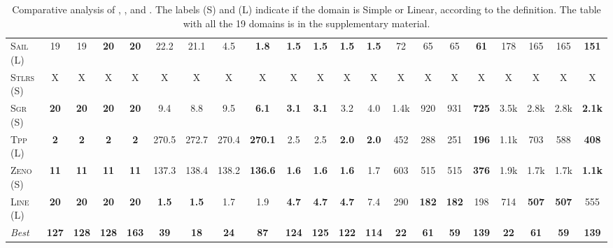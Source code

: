 \documentclass[11pt,landscape]{article}
\begin{document}
\begin{table*}[tb]
{\begin{tabular}{|l||cccc||cccc||cccc||cccc||cccc||}
\textsc{Sail} (L)&19&19&\textbf{20}&\textbf{20}&22.2&21.1&4.5&\textbf{1.8}&\textbf{1.5}&\textbf{1.5}&\textbf{1.5}&\textbf{1.5}&72&65&65&\textbf{61}&178&165&165&\textbf{151}\\
\textsc{Stlrs} (S)&X&X&X&X&X&X&X&X&X&X&X&X&X&X&X&X&X&X&X&X\\
\textsc{Sgr} (S)&\textbf{20}&\textbf{20}&\textbf{20}&\textbf{20}&9.4&8.8&9.5&\textbf{6.1}&\textbf{3.1}&\textbf{3.1}&3.2&4.0&1.4k&920&931&\textbf{725}&3.5k&2.8k&2.8k&\textbf{2.1k}\\
\textsc{Tpp} (L)&\textbf{2}&\textbf{2}&\textbf{2}&\textbf{2}&270.5&272.7&270.4&\textbf{270.1}&2.5&2.5&\textbf{2.0}&\textbf{2.0}&452&288&251&\textbf{196}&1.1k&703&588&\textbf{408}\\
\textsc{Zeno} (S)&\textbf{11}&\textbf{11}&\textbf{11}&\textbf{11}&137.3&138.4&138.2&\textbf{136.6}&\textbf{1.6}&\textbf{1.6}&\textbf{1.6}&1.7&603&515&515&\textbf{376}&1.9k&1.7k&1.7k&\textbf{1.1k}\\
\textsc{Line} (L)&\textbf{20}&\textbf{20}&\textbf{20}&\textbf{20}&\textbf{1.5}&\textbf{1.5}&1.7&1.9&\textbf{4.7}&\textbf{4.7}&\textbf{4.7}&7.4&290&\textbf{182}&\textbf{182}&198&714&\textbf{507}&\textbf{507}&555
\\\hline
\textit{Best}&\textbf{127}&\textbf{128}&\textbf{128}&\textbf{163}&\textbf{39}&\textbf{18}&\textbf{24}&\textbf{87}&\textbf{124}&\textbf{125}&\textbf{122}&\textbf{114}&\textbf{22}&\textbf{61}&\textbf{59}&\textbf{139}&\textbf{22}&\textbf{61}&\textbf{59}&\textbf{139}\\\hline

        \end{tabular}}
        \caption{Comparative analysis of \pattyo, \pattyg, \pattyh and \pattyf. The labels (S) and (L) indicate if the domain is Simple or Linear, according to the \ipc definition. The table with all the 19 domains is in the supplementary material.}
        \label{tab:experiments}
        \end{table*}
        
\end{document}
